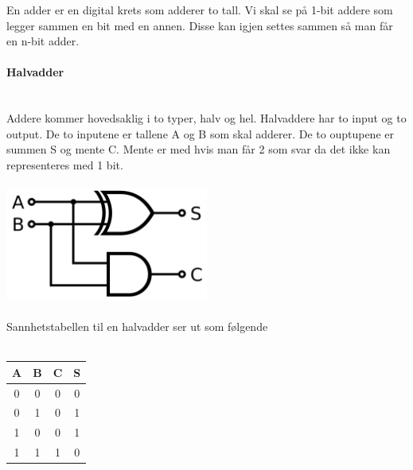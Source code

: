 En adder er en digital krets som adderer to tall.
Vi skal se på 1-bit addere som legger sammen en bit med en annen.
Disse kan igjen settes sammen så man får en n-bit adder.



\paragraph{Halvadder} \mbox{} \\
Addere kommer hovedsaklig i to typer, halv og hel.
Halvaddere har to input og to output.
De to inputene er tallene A og B som skal adderer.
De to ouptupene er summen S og mente C.
Mente er med hvis man får 2 som svar da det ikke kan representeres med 1 bit.
\\\\
\includegraphics[width=0.5\textwidth]{./img/half-adder}
\\\\
Sannhetstabellen til en halvadder ser ut som følgende
\\\\
\begin{tabular}{c|c|c|c}
  A & B & C & S \\ \hline
  0 & 0 & 0 & 0 \\
  0 & 1 & 0 & 1 \\
  1 & 0 & 0 & 1 \\
  1 & 1 & 1 & 0
\end{tabular}



